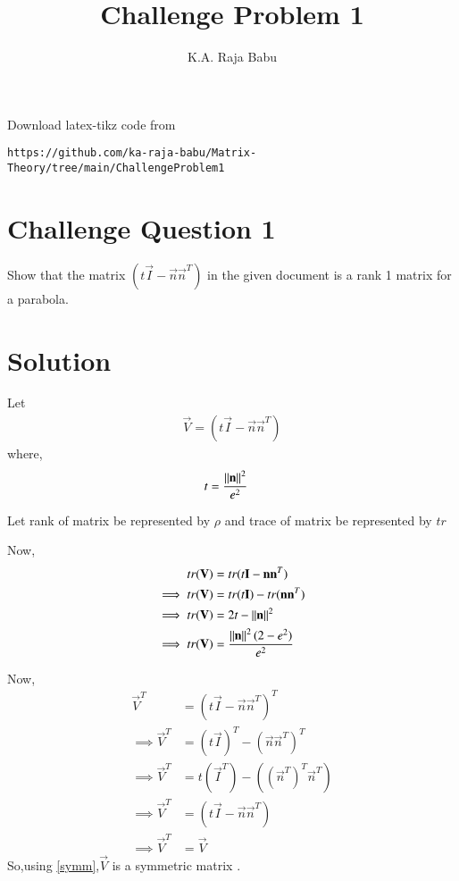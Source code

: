 \documentclass[journal,12pt,twocolumn]{IEEEtran}
\begin{document}
     \def\rightbox#1{\makebox[0in][r]{#1}}
     \def\centbox#1{\makebox[0in]{#1}}
     \def\topbox#1{\raisebox{-\baselineskip}[0in][0in]{#1}}
     \def\midbox#1{\raisebox{-0.5\baselineskip}[0in][0in]{#1}}
\vspace{3cm}
\title{Challenge Problem 1}
\author{K.A. Raja Babu}
\maketitle
\newpage
\bigskip
\renewcommand{\thefigure}{\theenumi}
\renewcommand{\thetable}{\theenumi}
Download latex-tikz code from 
%
\begin{lstlisting}
https://github.com/ka-raja-babu/Matrix-Theory/tree/main/ChallengeProblem1
\end{lstlisting}
%
\section{Challenge Question 1}
Show that the matrix $(t\vec{I}-\vec{n}\vec{n}^T)$ in the given document is a rank 1 matrix for a parabola.
%
\section{Solution}
Let
\begin{align}
    \vec{V} = (t\vec{I}-\vec{n}\vec{n}^T) 
\end{align}
where,
\begin{align}
    t &= \frac{\left\lVert\mathbf{n}\right\rVert^2}{e^2}
\end{align}

Let rank of matrix be represented by $\rho$ and trace of matrix be represented by $tr$

Now,
\begin{align}
    tr(\mathbf{V}) &= tr(t\mathbf{I}-\mathbf{n}\mathbf{n}^T)
    \\
    \implies tr(\mathbf{V}) &= tr(t\mathbf{I}) - tr(\mathbf{n}\mathbf{n}^T)
    \\
    \implies tr(\mathbf{V}) &= 2t - \left\lVert\mathbf{n}\right\rVert^2
    \\
    \implies tr(\mathbf{V}) &= \frac{\left\lVert\mathbf{n}\right\rVert^2(2-e^2)}{e^2} \label{trace}
\end{align}

Now,
\begin{align}
    \vec{V}^T &= (t\vec{I}-\vec{n}\vec{n}^T)^T
    \\
    \implies \vec{V}^T &= (t\vec{I})^T-(\vec{n}\vec{n}^T)^T
    \\
    \implies \vec{V}^T &= t(\vec{I}^T) - ((\vec{n}^T)^T\vec{n}^T)
    \\
    \implies \vec{V}^T &= (t\vec{I}-\vec{n}\vec{n}^T)
    \\
    \implies \vec{V}^T &= \vec{V}    \label{symm}
\end{align}
So,using \eqref{symm},$\vec{V}$ is a symmetric matrix .
\end{document}
